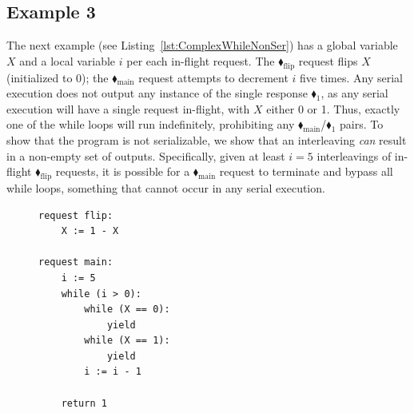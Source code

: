 \subsection{Example 3}

The next example (see Listing~\ref{lst:ComplexWhileNonSer}) has a global variable $X$ and a local variable $i$ per each in-flight request. The {\color{ForestGreen}$\blacklozenge_\text{flip}$} request flips $X$ (initialized to 0); the {\color{ForestGreen}$\blacklozenge_\text{main}$} request attempts to decrement $i$ five times.
%
%
Any serial execution does not output any instance of the single response {\color{red}$\blacklozenge_1$}, 
as any serial execution will have a single request in-flight, with $X$ either 0 or 1. Thus, exactly one of the while loops will run indefinitely, prohibiting any {\color{ForestGreen}$\blacklozenge_\text{main}$}/{\color{red}$\blacklozenge_1$} pairs.
%
%
To show that the program is not serializable, we show that an interleaving \emph{can} result in a non-empty set of outputs. 
%
%
Specifically, given at least $i=5$ interleavings of in-flight {\color{ForestGreen}$\blacklozenge_\text{flip}$} requests, it is possible for a {\color{ForestGreen}$\blacklozenge_\text{main}$} request to terminate and bypass all while loops, something that cannot occur in any serial execution.
%

\vspace{1em}  
\begin{figure}
	  \vspace{-1em}  %
	\centering
	\begin{lstlisting}[caption={Not serializable},label={lst:ComplexWhileNonSer},numbers=none]
request flip: 
    X := 1 - X 

request main:
    i := 5
    while (i > 0):
        while (X == 0):
            yield
        while (X == 1):
            yield
        i := i - 1

    return 1        
	\end{lstlisting}
\vspace{-0.5em}  %
\end{figure}
\vspace{1em}  %

